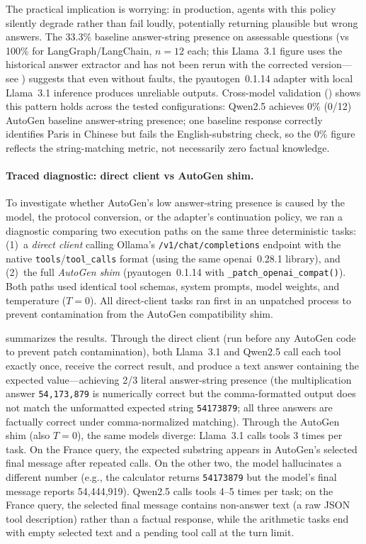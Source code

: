 \documentclass[make,article,submit,moreauthors,pdftex]{mdpi}
\begin{document}
The practical implication is worrying: in production, agents with this policy silently degrade rather than fail loudly, potentially returning plausible but wrong answers. The 33.3\% baseline answer-string presence on assessable questions (vs 100\% for LangGraph/LangChain, $n = 12$ each; this Llama~3.1 figure uses the historical answer extractor and has not been rerun with the corrected version---see ) suggests that even without faults, the pyautogen~0.1.14 adapter with local Llama~3.1 inference produces unreliable outputs. Cross-model validation () shows this pattern holds across the tested configurations: Qwen2.5 achieves 0\% (0/12) AutoGen baseline answer-string presence; one baseline response correctly identifies Paris in Chinese but fails the English-substring check, so the 0\% figure reflects the string-matching metric, not necessarily zero factual knowledge.

\paragraph{Traced diagnostic: direct client vs AutoGen shim.}
{\color{green!50!black}To investigate whether AutoGen's low answer-string presence is caused by the model, the protocol conversion, or the adapter's continuation policy, we ran a diagnostic comparing two execution paths on the same three deterministic tasks:
(1)~a \emph{direct client} calling Ollama's \texttt{/v1/chat/completions} endpoint with the native \texttt{tools}/\texttt{tool\_calls} format (using the same openai~0.28.1 library), and
(2)~the full \emph{AutoGen shim} (pyautogen~0.1.14 with \texttt{\_patch\_openai\_compat()}).
Both paths used identical tool schemas, system prompts, model weights, and temperature ($T = 0$). All direct-client tasks ran first in an unpatched process to prevent contamination from the AutoGen compatibility shim.}

 summarizes the results.
Through the direct client (run before any AutoGen code to prevent patch contamination), both Llama~3.1 and Qwen2.5 call each tool exactly once, receive the correct result, and produce a text answer containing the expected value---achieving 2/3 literal answer-string presence (the multiplication answer \texttt{54,173,879} is numerically correct but the comma-formatted output does not match the unformatted expected string \texttt{54173879}; all three answers are factually correct under comma-normalized matching).
Through the AutoGen shim (also $T = 0$), the same models diverge: Llama~3.1 calls tools 3 times per task. On the France query, the expected substring appears in AutoGen's selected final message after repeated calls. On the other two, the model hallucinates a different number (e.g., the calculator returns \texttt{54173879} but the model's final message reports 54{,}444{,}919). Qwen2.5 calls tools 4--5 times per task; on the France query, the selected final message contains non-answer text (a raw JSON tool description) rather than a factual response, while the arithmetic tasks end with empty selected text and a pending tool call at the turn limit.
\end{document}
